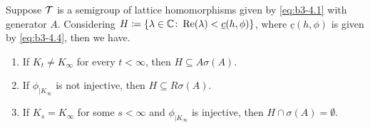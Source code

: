 \begin{theorem}\label{thm:b3-4.4}
	Suppose $\mathcal{T}$ is a semigroup of lattice homomorphisms given by \eqref{eq:b3-4.1} with generator $A$.
	Considering $H \coloneq \{\lambda \in \mathbb{C} \colon \mathop{}\!\mathrm{Re}(\lambda) < \underline{c}(h,\phi)\}$, where $\underline{c}(h,\phi)$ is given by \eqref{eq:b3-4.4}, then we have.
	\begin{enumerate}[\upshape (i)]
		\item 
		If $K_{t} \neq K_{\infty}$ for every $t < \infty$, then $H \subseteq A\sigma(A)$.
	
		\item 
		If $\phi_{|K_{\infty}}$ is not injective, then $H \subseteq R\sigma(A)$.
	
		\item 
		If $K_{s} = K_{\infty}$ for some $s < \infty$ and $\phi_{|K_{\infty}}$ is injective, then $H\cap\sigma(A) = \emptyset$.
	\end{enumerate} 
\end{theorem}
